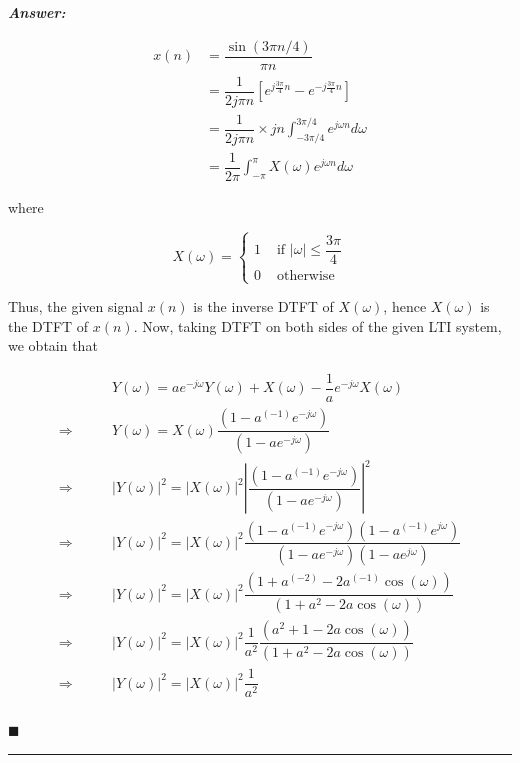 \documentclass[12pt]{article}
\theoremstyle{definition}
\newenvironment{answer}{
    \textbf{\textit{Answer:}} \qquad
}{\hfill $\blacksquare$ \\ 

\begin{center}
    \rule{0.8\linewidth}{1.5px} 
    \vspace*{1cm}   
\end{center}
}
\newcommand{\inv}[1][1]{^{(- #1)}}
\begin{document}
\begin{answer}
\begin{enumerate}
        \begin{align*}
            x(n)
            & = \dfrac{\sin(3\pi n /4)}{\pi n}\\
            & = \dfrac{1}{2j \pi n} \left[ e^{j \frac{3\pi}{4}n } - e^{-j \frac{3\pi}{4}n } \right]\\
            & = \dfrac{1}{2j \pi n} \times jn \int_{-3\pi/4}^{3\pi/4} e^{j \omega n} d\omega\\
            & = \dfrac{1}{2\pi} \int_{-\pi}^{\pi} X(\omega) e^{j \omega n} d\omega
        \end{align*}

        where 

        $$
        X(\omega) = \begin{cases}
            1 & \text{ if } \vert \omega \vert \leq \dfrac{3\pi}{4}\\
            0 & \text{ otherwise}
        \end{cases}
        $$

        Thus, the given signal $x(n)$ is the inverse DTFT of $X(\omega)$, hence $X(\omega)$ is the DTFT of $x(n)$. Now, taking DTFT on both sides of the given LTI system, we obtain that 

        \begin{align*}
            & Y(\omega) = a e^{-j\omega} Y(\omega) + X(\omega) - \dfrac{1}{a} e^{-j\omega} X(\omega)\\
            \Rightarrow \qquad & Y(\omega) = X(\omega) \dfrac{(1 - a\inv e^{-j\omega})}{(1 - a e^{-j\omega})}\\
            \Rightarrow \qquad & \vert Y(\omega) \vert^2 = \vert X(\omega) \vert^2 \left\vert \dfrac{(1 - a\inv e^{-j\omega})}{(1 - a e^{-j\omega})} \right\vert^2\\
            \Rightarrow \qquad & \vert Y(\omega) \vert^2 = \vert X(\omega) \vert^2 \dfrac{(1 - a\inv e^{-j\omega})(1 - a\inv e^{j\omega})}{(1 - ae^{-j\omega})(1 - ae^{j\omega})} \\
            \Rightarrow \qquad & \vert Y(\omega) \vert^2 = \vert X(\omega) \vert^2 \dfrac{(1 + a\inv[2] - 2a\inv \cos(\omega))}{(1 + a^2 - 2a \cos(\omega))}\\
            \Rightarrow \qquad & \vert Y(\omega) \vert^2 = \vert X(\omega) \vert^2 \dfrac{1}{a^2} \dfrac{(a^2 + 1 - 2a \cos(\omega))}{(1 + a^2 - 2a \cos(\omega))}\\
            \Rightarrow \qquad & \vert Y(\omega) \vert^2 = \vert X(\omega) \vert^2 \dfrac{1}{a^2}\\
        \end{align*}


\end{enumerate}
\end{answer}
\end{document}
